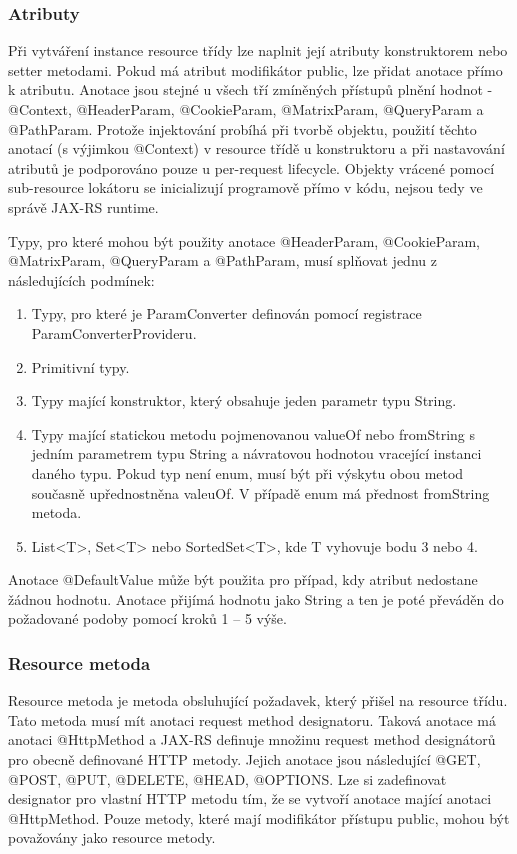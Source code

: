 \documentclass[11pt,twoside,a4paper]{book}
\begin{document}
\subsubsection{Atributy}

Při vytváření instance resource třídy lze naplnit její atributy konstruktorem nebo setter
metodami. Pokud má atribut modifikátor public, lze přidat anotace přímo k atributu. Anotace
jsou stejné u všech tří zmíněných přístupů plnění hodnot - @Context, @HeaderParam,
@CookieParam, @MatrixParam, @QueryParam a @PathParam. Protože injektování probíhá
při tvorbě objektu, použití těchto anotací (s výjimkou @Context) v resource třídě u
konstruktoru a při nastavování atributů je podporováno pouze u per-request lifecycle. Objekty
vrácené pomocí sub-resource lokátoru se inicializují programově přímo v kódu, nejsou tedy
ve správě JAX-RS runtime.

Typy, pro které mohou být použity anotace @HeaderParam, @CookieParam, @MatrixParam,
@QueryParam a @PathParam, musí splňovat jednu z následujících podmínek:

\begin{enumerate}
  \item Typy, pro které je ParamConverter definován pomocí registrace
  ParamConverterProvideru.
  \item Primitivní typy.
  \item Typy mající konstruktor, který obsahuje jeden parametr typu String.
  \item Typy mající statickou metodu pojmenovanou valueOf nebo fromString s jedním
parametrem typu String a návratovou hodnotou vracející instanci daného typu. Pokud
typ není enum, musí být při výskytu obou metod současně upřednostněna valeuOf. V
případě enum má přednost fromString metoda.
  \item List<T>, Set<T> nebo SortedSet<T>, kde T vyhovuje bodu 3 nebo 4.
\end{enumerate}

Anotace @DefaultValue může být použita pro případ, kdy atribut nedostane žádnou hodnotu.
Anotace přijímá hodnotu jako String a ten je poté převáděn do požadované podoby pomocí
kroků 1 – 5 výše.

\subsubsection{Resource metoda}

Resource metoda je metoda obsluhující požadavek, který přišel na resource třídu. Tato metoda
musí mít anotaci request method designatoru. Taková anotace má anotaci @HttpMethod a
JAX-RS definuje množinu request method designátorů pro obecně definované HTTP metody.
Jejich anotace jsou následující @GET, @POST, @PUT, @DELETE, @HEAD, @OPTIONS.
Lze si zadefinovat designator pro vlastní HTTP metodu tím, že se vytvoří anotace mající
anotaci @HttpMethod. Pouze metody, které mají modifikátor přístupu public, mohou být
považovány jako resource metody.
\end{document}
